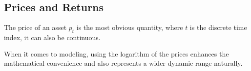 
\subsection{Prices and Returns}

The price of an asset $p_t$ is the most obvious quantity, where $t$ is the discrete time index, it can also be continuous.

When it comes to modeling, using the logarithm of the prices enhances the mathematical convenience and also represents a wider dynamic range naturally.



